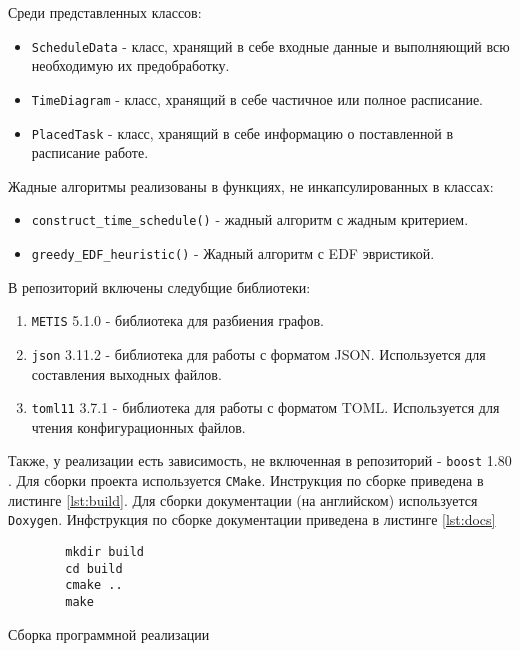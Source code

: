 Среди представленных классов:
\begin{itemize}
    \item \texttt{ScheduleData} - класс, хранящий в себе входные данные и выполняющий всю необходимую их предобработку.
    \item \texttt{TimeDiagram} - класс, хранящий в себе частичное или полное расписание.
    \item \texttt{PlacedTask} - класс, хранящий в себе информацию о поставленной в расписание работе.
\end{itemize}

Жадные алгоритмы реализованы в функциях, не инкапсулированных в классах:
\begin{itemize}
    \item \texttt{construct\_time\_schedule()} - жадный алгоритм с жадным критерием.
    \item \texttt{greedy\_EDF\_heuristic()} - Жадный алгоритм с EDF эвристикой.
\end{itemize}

В репозиторий включены следубщие библиотеки:
\begin{enumerate}
    \item \texttt{METIS} 5.1.0 \cite{METIS_lib} - библиотека для разбиения графов.
    \item \texttt{json} 3.11.2 \cite{json_lib} - библиотека для работы с форматом JSON. Используется для составления выходных файлов.
    \item \texttt{toml11} 3.7.1 \cite{toml11_lib} - библиотека для работы с форматом TOML. Используется для чтения конфигурационных файлов.
\end{enumerate}

Также, у реализации есть зависимость, не включенная в репозиторий - \texttt{boost} 1.80 \cite{boost_framework}. Для сборки проекта используется \texttt{CMake}. Инструкция по сборке приведена в листинге \ref{lst:build}. Для сборки документации (на английском) используется \texttt{Doxygen}. Инфструкция по сборке документации приведена в листинге \ref{lst:docs}

\begin{listing}[!htbp]
    \begin{verbatim}
        mkdir build
        cd build
        cmake ..
        make
    \end{verbatim}
    \caption{Сборка программной реализации}
    \label{lst:build}
\end{listing}

